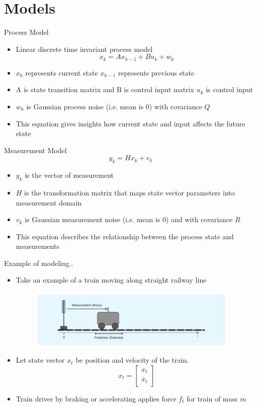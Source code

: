 \documentclass{beamer}
\begin{document}
\section{Models}
\begin{frame}{Process Model}
\begin{itemize}
  \item Linear discrete time invariant process model \[ x_k = Ax_{k-1} + Bu_k + w_{k} \]
  \item \(x_k\) represents current state  \(x_{k-1}\) represents previous state
  \item A is state transition matrix and B is control input matrix \(u_k\) is control input
  \item \(w_{k}\) is Gaussian process noise (i.e. mean is 0) with covariance \(Q\)
  \item This equation gives insights how current state and input affects the future state
\end{itemize}
\vskip 1cm
\end{frame}
\begin{frame}{Measurement Model}
\[ y_k = Hx_{k} + v_k \]
\begin{itemize}
  \item \(y_k\) is the vector of measurement
  \item \(H\) is the transformation matrix that maps state vector parameters into measurement domain
  \item \(v_{k}\) is Gaussian measurement noise (i.e. mean is 0) and with covariance \(R\)
  \item This equation describes the relationship between the process state and measurements
\end{itemize}
\vskip 1cm
\end{frame}
\begin{frame}{Example of modeling..}
\begin{itemize}
  \item Take an example of a train moving along straight railway line
  \begin{figure} [ht!]
    \includegraphics[width=100mm]{images/train0.png}
  \end{figure}
  \item Let state vector \(x_t\) be position and velocity of the train.
    \[
      x_t = \begin{bmatrix} x_t \\ \dot{x_t} \end{bmatrix}
    \]
  \item Train driver by braking or accelerating applies force \(f_t\) for train of mass \(m\)
\end{itemize}
\vskip 1cm
\end{frame}
\end{document}
